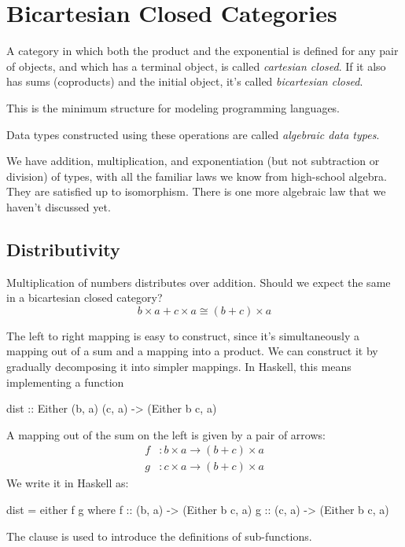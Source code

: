 \documentclass[DaoFP]{subfiles}
\begin{document}
\section{Bicartesian Closed Categories}

A category in which both the product and the exponential is defined for any pair of objects, and which has a terminal object, is called \emph{cartesian closed}. If it also has sums (coproducts) and the initial object, it's called \emph{bicartesian closed}. 

This is the minimum structure for modeling programming languages. 

Data types constructed using these operations are called \emph{algebraic data types}.

We have addition, multiplication, and exponentiation (but not subtraction or division) of types, with all the familiar laws we know from high-school algebra. They are satisfied up to isomorphism. There is one more algebraic law that we haven't discussed yet.

\subsection{Distributivity}

Multiplication of numbers distributes over addition. Should we expect the same in a bicartesian closed category?
\[b \times a + c \times a \cong (b + c) \times a\]

The left to right mapping is easy to construct, since it's simultaneously a mapping out of a sum and a mapping into a product. We can construct it by gradually decomposing it into simpler mappings. In Haskell, this means implementing a function
\begin{haskell}
dist :: Either (b, a) (c, a) -> (Either b c, a)
\end{haskell}
A mapping out of the sum on the left is given by a pair of arrows:
\begin{align*}
f &\colon b\times a \to (b + c) \times a \\
g &\colon c\times a \to (b + c) \times a 
\end{align*}
We write it in Haskell as:
\begin{haskell}
dist = either f g
  where
    f   :: (b, a) -> (Either b c, a)
    g   :: (c, a) -> (Either b c, a)
\end{haskell}
The  clause is used to introduce the definitions of sub-functions.
\end{document}
